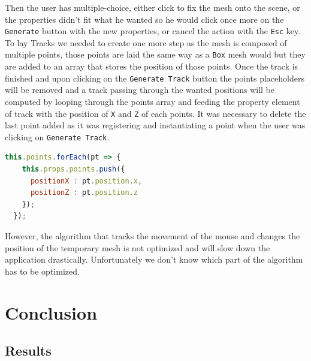 \documentclass{scrbook}
\begin{document}
Then the user has multiple-choice, either click to fix the mesh onto the scene, or the properties didn't fit what he wanted so he would click once more on the \texttt{Generate} button with the new properties, 
or cancel the action with the \texttt{Esc} key. 
To lay Tracks we needed to create one more step as the mesh is composed of multiple points, those points are laid the same way as a \texttt{Box} mesh would but they are added to an array that stores the position of those points. 
Once the track is finished and upon clicking on the \texttt{Generate Track} button the points placeholders will be removed and a track passing through the wanted positions will be computed by looping through the points array and feeding the property element of track with the position of \texttt{X} and \texttt{Z} of each points. 
It was necessary to delete the last point added as it was registering and instantiating a point when the user was clicking on \texttt{Generate Track}.

\begin{lstlisting}[language=JavaScript, gobble=2, basicstyle=\ttfamily\small]
  this.points.forEach(pt => {                      
    this.props.points.push({
      positionX : pt.position.x,
      positionZ : pt.position.z
    });
  });
\end{lstlisting} 

However, the algorithm that tracks the movement of the mouse and changes the position of the temporary mesh is not optimized and will slow down the application drastically. Unfortunately we don't know which part of the algorithm has to be optimized.


\chapter{Conclusion}

\section{Results}
\end{document}

